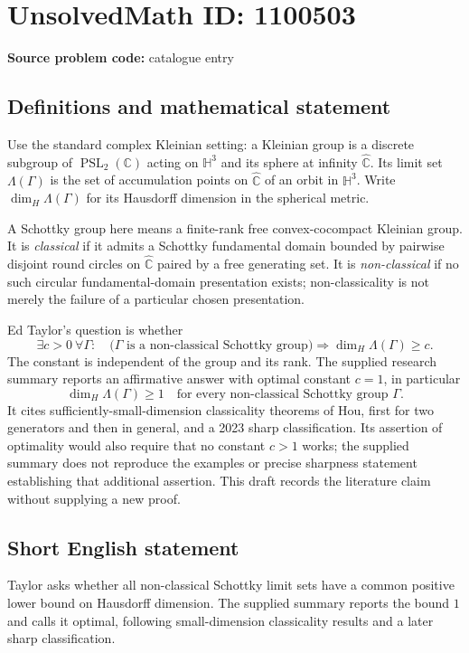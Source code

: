 \documentclass[11pt]{article}
\newcommand{\C}{\mathbb{C}}
\begin{document}
\section*{UnsolvedMath ID: 1100503}
\textbf{Source problem code:} catalogue entry
\subsection{Definitions and mathematical statement}
Use the standard complex Kleinian setting: a Kleinian group is a discrete subgroup of $\operatorname{PSL}_2(\C)$ acting on $\mathbb H^3$ and its sphere at infinity $\widehat{\C}$. Its limit set $\Lambda(\Gamma)$ is the set of accumulation points on $\widehat{\C}$ of an orbit in $\mathbb H^3$. Write $\dim_H\Lambda(\Gamma)$ for its Hausdorff dimension in the spherical metric.

A Schottky group here means a finite-rank free convex-cocompact Kleinian group. It is \emph{classical} if it admits a Schottky fundamental domain bounded by pairwise disjoint round circles on $\widehat{\C}$ paired by a free generating set. It is \emph{non-classical} if no such circular fundamental-domain presentation exists; non-classicality is not merely the failure of a particular chosen presentation.

Ed Taylor's question is whether
\[
\exists c>0\ \forall\Gamma:\quad
\bigl(\Gamma\text{ is a non-classical Schottky group}\bigr)
\Longrightarrow \dim_H\Lambda(\Gamma)\geq c.
\]
The constant is independent of the group and its rank. The supplied research summary reports an affirmative answer with optimal constant $c=1$, in particular
\[
\dim_H\Lambda(\Gamma)\geq1
\quad\text{for every non-classical Schottky group }\Gamma.
\]
It cites sufficiently-small-dimension classicality theorems of Hou, first for two generators and then in general, and a 2023 sharp classification. Its assertion of optimality would also require that no constant $c>1$ works; the supplied summary does not reproduce the examples or precise sharpness statement establishing that additional assertion. This draft records the literature claim without supplying a new proof.
\subsection{Short English statement}
Taylor asks whether all non-classical Schottky limit sets have a common positive lower bound on Hausdorff dimension. The supplied summary reports the bound $1$ and calls it optimal, following small-dimension classicality results and a later sharp classification.
\end{document}
